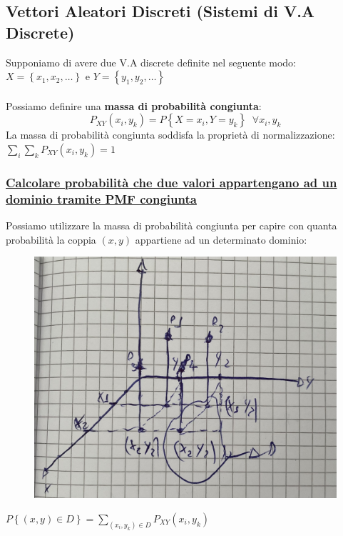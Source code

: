 \documentclass{article}
\begin{document}
\subsection{Vettori Aleatori Discreti (Sistemi di V.A Discrete)}
Supponiamo di avere due V.A discrete definite nel seguente modo: \\
$X = \left\{x_1,x_2, \dots \right\}$ e $Y = \left\{y_1,y_2, \dots \right\}$ \\ \\
Possiamo definire una \textbf{massa di probabilità congiunta}:
\[P_{XY}(x_i,y_k) = P \left\{X = x_i, Y = y_k\right\} \;\; \forall x_i,y_k\]
La massa di probabilità congiunta soddisfa la proprietà di normalizzazione: $\sum_{i} \sum_{k} P_{XY}(x_i,y_k) = 1$
\subsubsection{\underline{Calcolare probabilità che due valori appartengano ad un dominio tramite PMF congiunta}}
Possiamo utilizzare la massa di probabilità congiunta per capire con quanta probabilità la coppia $(x,y)$ appartiene ad un determinato dominio:
\begin{figure}[ht]
\centering
\includegraphics[scale=0.16]{images/74.VettAleaDisc1.jpeg}
\end{figure} 
$P \left\{(x,y) \in D \right\} = \sum_{(x_i,y_k) \in D} P_{XY}(x_i, y_k)$
\end{document}
